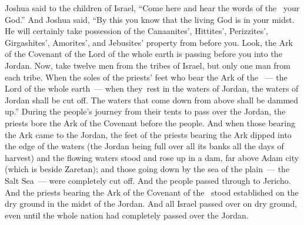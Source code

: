 \begin{inparaenum}
   Joshua said to the children of Israel, ``Come here and hear the words of the \lord\ your God.''%
   And Joshua said, ``By this you know that the living God is in your midst. He will certainly take possession of the Canaanites', Hittites', Perizzites', Girgashites', Amorites', and Jebusites' property from before you.%
   Look, the Ark of the Covenant of the Lord of the whole earth is passing before you into the Jordan.%
   Now, take twelve men from the tribes of Israel, but only one man from each tribe.%
   When the soles of the priests' feet who bear the Ark of the \lord~--- the Lord of the whole earth~--- when they\understood{}\ rest in the waters of Jordan, the waters of Jordan shall be cut off. The waters that come down from above shall be dammed up.''%
   During the people's journey from their tents to pass over the Jordan, the priests bore the Ark of the Covenant before the people.%
   And when those bearing the Ark came to the Jordan, the feet of the priests bearing the Ark dipped into the edge of the waters (the Jordan being full over all its banks all the days of harvest)%
   and the flowing waters stood and rose up in a dam, far above Adam city (which is beside Zaretan); and those going down by the sea of the plain~--- the Salt Sea~--- were completely cut off. And the people passed through to Jericho.%
   And the priests bearing the Ark of the Covenant of the \lord\ stood established on the dry ground in the midst of the Jordan. And all Israel passed over on dry ground, even until the whole nation had completely passed over the Jordan.%
\end{inparaenum}
